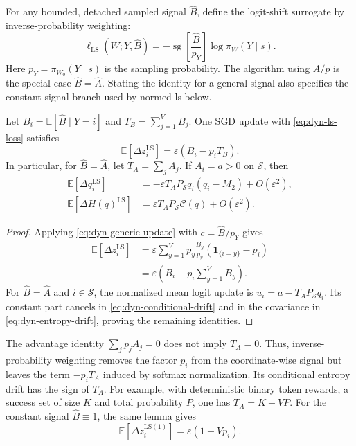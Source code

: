 For any bounded, detached sampled signal $\widehat B$, define the logit-shift
surrogate by inverse-probability weighting:
\begin{equation}
 \ell_{\mathrm{LS}}(W;Y,\widehat B)
 =-\operatorname{sg}\left[\frac{\widehat B}{p_Y}\right]
                  \log\pi_W(Y\mid s).
 \label{eq:dyn-ls-loss}
\end{equation}
Here $p_Y=\pi_{W_0}(Y\mid s)$ is the sampling probability. The algorithm
using $A/p$ is the special case $\widehat B=\widehat A$. Stating the
identity for a general signal also specifies the constant-signal branch
used by normed-ls below.

\begin{lemma}
\label{lem:dyn-logit-shift}
Let $B_i=\mathbb E[\widehat B\mid Y=i]$ and
$T_B=\sum_{j=1}^V B_j$. One SGD update with
\eqref{eq:dyn-ls-loss} satisfies
\begin{equation}
 \mathbb E[\Delta z_i^{\mathrm{LS}}]
 =\varepsilon(B_i-p_iT_B).
 \label{eq:dyn-ls-mean}
\end{equation}
In particular, for $\widehat B=\widehat A$, let
$T_A=\sum_jA_j$. If $A_i=a>0$ on $\mathcal S$, then
\begin{align}
 \mathbb E[\Delta q_i^{\mathrm{LS}}]
 &=-\varepsilon T_AP_{\mathcal S}q_i(q_i-M_2)+O(\varepsilon^2),
 \label{eq:dyn-ls-q}\\
 \mathbb E[\Delta H(q)^{\mathrm{LS}}]
 &=\varepsilon T_AP_{\mathcal S}\mathcal C(q)+O(\varepsilon^2).
 \label{eq:dyn-ls-h}
\end{align}
\end{lemma}

\begin{proof}
Applying \eqref{eq:dyn-generic-update} with
$c=\widehat B/p_Y$ gives
\begin{align*}
 \mathbb E[\Delta z_i^{\mathrm{LS}}]
 &=\varepsilon\sum_{y=1}^V p_y\frac{B_y}{p_y}
                   (\mathbf 1_{\{i=y\}}-p_i)\\
 &=\varepsilon\left(B_i-p_i\sum_{y=1}^V B_y\right).
\end{align*}
For $\widehat B=\widehat A$ and $i\in\mathcal S$, the normalized
mean logit update is $u_i=a-T_AP_{\mathcal S}q_i$. Its constant part
cancels in \eqref{eq:dyn-conditional-drift} and in the covariance in
\eqref{eq:dyn-entropy-drift}, proving the remaining identities.
\end{proof}

The advantage identity $\sum_jp_jA_j=0$ does not imply $T_A=0$.
Thus, inverse-probability weighting removes the factor $p_i$ from the
coordinate-wise signal but leaves the term $-p_iT_A$ induced by softmax
normalization. Its conditional entropy drift has the sign of $T_A$.
For example, with deterministic binary token rewards, a success set of
size $K$ and total probability $P$, one has $T_A=K-VP$.
For the constant signal $\widehat B\equiv1$, the same lemma gives
\begin{equation}
 \mathbb E[\Delta z_i^{\mathrm{LS}(1)}]
 =\varepsilon(1-Vp_i).
 \label{eq:dyn-ls-constant}
\end{equation}

